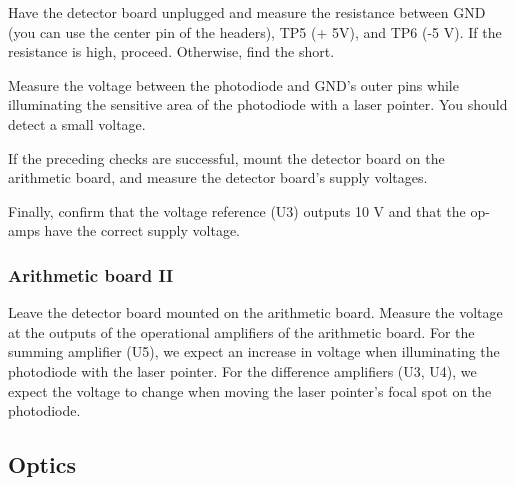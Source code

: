 Have the detector board unplugged and measure the resistance between GND (you can use the center pin of the headers), TP5 (+ 5V), and TP6 (-5 V). If the resistance is high, proceed. Otherwise, find the short.

Measure the voltage between the photodiode and GND's outer pins while illuminating the sensitive area of the photodiode with a laser pointer.
You should detect a small voltage.

If the preceding checks are successful, mount the detector board on the arithmetic board, and measure the detector board's supply voltages.

Finally, confirm that the voltage reference (U3) outputs 10 V and that the op-amps have the correct supply voltage.

\subsubsection{Arithmetic board II}

Leave the detector board mounted on the arithmetic board.
Measure the voltage at the outputs of the operational amplifiers of the arithmetic board.
For the summing amplifier (U5), we expect an increase in voltage when illuminating the photodiode with the laser pointer.
For the difference amplifiers (U3, U4), we expect the voltage to change when moving the laser pointer's focal spot on the photodiode.

\subsection{Optics}